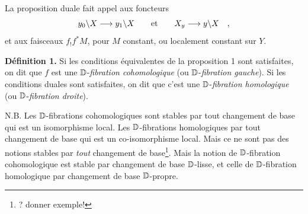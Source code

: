 
La proposition duale fait appel aux foncteurs
\[
y_0\backslash X \longrightarrow y_1\backslash X \qquad \text{et} \qquad X_y \longrightarrow y\backslash X \quad ,
\]
et aux faisceaux $f_!f^*M$, pour $M$ constant, ou localement constant sur $Y$.

\textbf{Définition 1.} Si les conditions équivalentes de la proposition 1 sont satisfaites, on dit que $f$ est une $\mathbb{D}$-\textit{fibration cohomologique} (ou $\mathbb{D}$-\textit{fibration gauche}). Si les conditions duales sont satisfaites, on dit que c'est une $\mathbb{D}$-\textit{fibration homologique} (ou $\mathbb{D}$-\textit{fibration droite}).

N.B. Les $\mathbb{D}$-fibrations cohomologiques sont stables par tout changement de base qui est un isomorphisme local. Les $\mathbb{D}$-fibrations homologiques par tout changement de base qui est un co-isomorphisme local. Mais ce ne sont pas des notions stables par \textit{tout} changement de base\footnote[34]{? donner exemple!}. Mais la notion de $\mathbb{D}$-fibration cohomologique est stable par changement de base $\mathbb{D}$-lisse, et celle de $\mathbb{D}$-fibration homologique par changement de base $\mathbb{D}$-propre.

